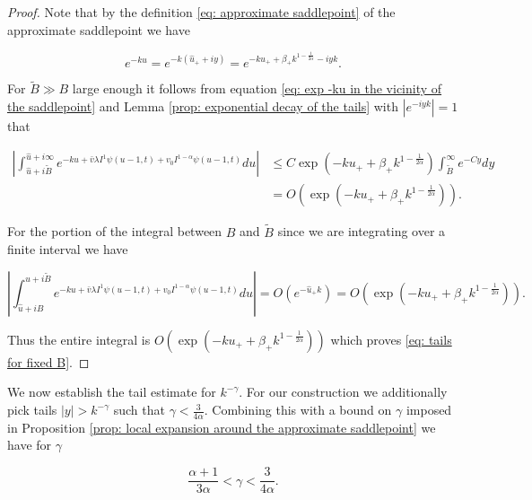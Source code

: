 \documentclass[12pt,twoside]{article}
\theoremstyle{plain}
\theoremstyle{plain}
\theoremstyle{definition}
\theoremstyle{remark}
\numberwithin{equation}{section}
\begin{document}
\begin{proof}

Note that by the definition \eqref{eq: approximate saddlepoint} of the approximate saddlepoint we have

\begin{equation}
\label{eq: exp -ku in the vicinity of the saddlepoint}
e^{-ku} = e^{-k(\hat u_+  + iy)} = e^{-ku_+ + \beta_+ k ^{1-\frac{1}{2\alpha}}- iyk}.
\end{equation}

For $\tilde B \gg B$ large enough it follows from equation \eqref{eq: exp -ku in the vicinity of the saddlepoint} and Lemma \ref{prop: exponential decay of the tails} with $\left|e^{-iyk}\right| = 1$ that

$$
\begin{aligned}
\left|\int_{\hat{u}+i \tilde B}^{\hat{u}+i \infty} e^{-ku+\bar{v} \lambda I^{1} \psi(u-1, t)+v_{0} I^{1-\alpha} \psi(u-1, t)} d u\right| & \leq C \exp \left(-ku_+ +\beta_+ k^{1 -\frac{1}{2\alpha}}\right) \int_{\tilde{B}}^{\infty} e^{-C y} d y \\[10pt]
&= O\left(\exp \left(-ku_+ +\beta_+ k^{1 -\frac{1}{2\alpha}}\right)\right).
\end{aligned}
$$

For the portion of the integral between $B$ and $\tilde B$ since we are integrating over a finite interval we have

$$
\left|\int_{\hat{u}+i B}^{\hat{u}+i \tilde B} e^{-ku+\bar{v} \lambda I^{1} \psi(u-1, t)+v_{0} I^{1-\alpha} \psi(u-1, t)} d u\right| = O\left(e^{-\hat u_+ k}\right) = O\left(\exp \left(-ku_+ +\beta_+ k^{1 -\frac{1}{2\alpha}}\right)\right).
$$

Thus the entire integral is $O\left(\exp \left(-ku_+ +\beta_+ k^{1 -\frac{1}{2\alpha}}\right)\right)$ which proves \eqref{eq: tails for fixed B}.

\end{proof}

We now establish the tail estimate for $k^{-\gamma}$. For our construction we additionally pick tails $|y| > k^{-\gamma}$ such that $\gamma < \frac{3}{4\alpha}$. Combining this with a bound on $\gamma$ imposed in Proposition \ref{prop: local expansion around the approximate saddlepoint} we have for $\gamma$

$$
\frac{\alpha+1}{3\alpha}< \gamma < \frac{3}{4\alpha}.
$$

\vspace{10pt}
\end{document}
